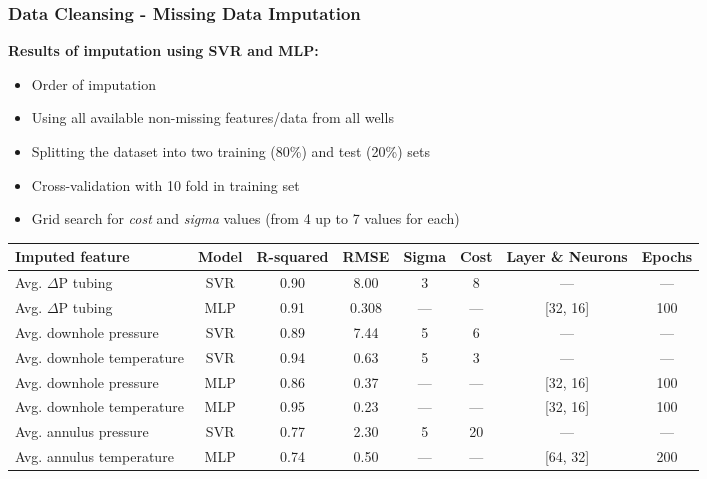 \documentclass[xcolor=table]{beamer}
\begin{document}
\begin{frame}
\frametitle{Data Cleansing - Missing Data Imputation}
\textbf{Results of imputation using SVR and MLP:}
\begin{itemize}
\item Order of imputation
\item Using all available non-missing features/data from all wells 
\item Splitting the dataset into two training (80\%) and test (20\%) sets
\item Cross-validation with 10 fold in training set
\item Grid search for \emph{cost} and \emph{sigma} values (from 4 up to 7 values for each)
\end{itemize}

\begin{table}
\begin{adjustbox}{width=1\linewidth,center}
\label{tb:rs_adpt}
\begin{tabular}{lccccccc}
\toprule
\textbf{Imputed feature}&\textbf{Model}&\textbf{R-squared}&\textbf{RMSE}&\textbf{Sigma}&\textbf{Cost}&\textbf{Layer \& Neurons}&\textbf{Epochs}\tabularnewline
\midrule
Avg. $\Delta$P tubing & SVR &\cellcolor{green!40}0.90 & 8.00 & 3 & 8 & ---&---\tabularnewline
Avg. $\Delta$P tubing & MLP & 0.91 & 0.308 & --- & --- & [32, 16] & 100 \tabularnewline
Avg. downhole pressure & SVR&\cellcolor{green!40}0.89 & 7.44 & 5 & 6 & ---&---\tabularnewline
Avg. downhole temperature & SVR&\cellcolor{green!40}0.94 & 0.63 & 5 & 3 & ---&---\tabularnewline
Avg. downhole pressure & MLP & 0.86 & 0.37& --- & --- & [32, 16] & 100\tabularnewline
Avg. downhole temperature & MLP &0.95  & 0.23 & --- & --- &[32, 16] & 100\tabularnewline
Avg. annulus pressure & SVR &\cellcolor{green!40}0.77 & 2.30 & 5 & 20 & ---&--- \tabularnewline
Avg. annulus temperature & MLP &0.74  & 0.50 & --- & --- & [64, 32] & 200 \tabularnewline

\bottomrule
\end{tabular}
\end{adjustbox}
\end{table}

\end{frame}
\end{document}
